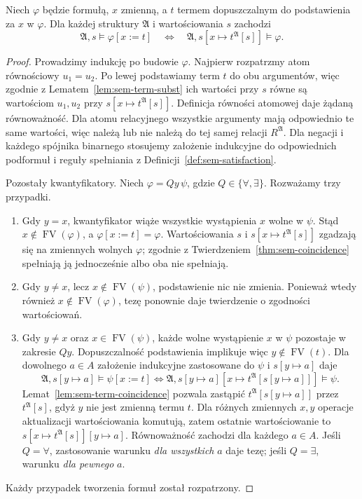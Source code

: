 \begin{twierdzenie}\label{thm:sem-substitution}
Niech $\varphi$ będzie formułą, $x$ zmienną, a $t$ termem
dopuszczalnym do podstawienia za $x$ w $\varphi$.
Dla każdej struktury $\mathfrak A$ i wartościowania $s$ zachodzi
\[
\mathfrak A,s\models\varphi[x:=t]
\quad\Longleftrightarrow\quad
\mathfrak A,s[x\mapsto t^{\mathfrak A}[s]]\models\varphi.
\]
\end{twierdzenie}
\begin{proof}
Prowadzimy indukcję po budowie $\varphi$. Najpierw
rozpatrzmy atom równościowy $u_1=u_2$. Po lewej
podstawiamy term $t$ do obu argumentów, więc zgodnie
z Lematem~\ref{lem:sem-term-subst} ich wartości przy $s$
równe są wartościom $u_1,u_2$ przy
$s[x\mapsto t^{\mathfrak A}[s]]$. Definicja równości
atomowej daje żądaną równoważność. Dla atomu relacyjnego
wszystkie argumenty mają odpowiednio te same wartości,
więc należą lub nie należą do tej samej relacji
$R^{\mathfrak A}$. Dla negacji i każdego spójnika
binarnego stosujemy założenie indukcyjne do odpowiednich
podformuł i reguły spełniania z
Definicji~\ref{def:sem-satisfaction}.

Pozostały kwantyfikatory. Niech $\varphi=Qy\,\psi$,
gdzie $Q\in\{\forall,\exists\}$. Rozważamy trzy przypadki.
\begin{enumerate}[label=(\roman*)]
\item Gdy $y=x$, kwantyfikator wiąże wszystkie wystąpienia
$x$ wolne w $\psi$. Stąd $x\notin\operatorname{FV}(\varphi)$,
a $\varphi[x:=t]=\varphi$. Wartościowania
$s$ i $s[x\mapsto t^{\mathfrak A}[s]]$ zgadzają się
na zmiennych wolnych $\varphi$; zgodnie z
Twierdzeniem~\ref{thm:sem-coincidence} spełniają ją
jednocześnie albo oba nie spełniają.
\item Gdy $y\ne x$, lecz $x\notin\operatorname{FV}(\psi)$,
podstawienie nic nie zmienia. Ponieważ wtedy również
$x\notin\operatorname{FV}(\varphi)$, tezę ponownie
daje twierdzenie o zgodności wartościowań.
\item Gdy $y\ne x$ oraz $x\in\operatorname{FV}(\psi)$,
każde wolne wystąpienie $x$ w $\psi$ pozostaje w zakresie
$Qy$. Dopuszczalność podstawienia implikuje więc
$y\notin\operatorname{FV}(t)$. Dla dowolnego $a\in A$
założenie indukcyjne zastosowane do $\psi$ i
$s[y\mapsto a]$ daje
\[
\mathfrak A,s[y\mapsto a]\models\psi[x:=t]
\iff
\mathfrak A,s[y\mapsto a]
  [x\mapsto t^{\mathfrak A}[s[y\mapsto a]]]
  \models\psi.
\]
Lemat~\ref{lem:sem-term-coincidence} pozwala zastąpić
$t^{\mathfrak A}[s[y\mapsto a]]$ przez
$t^{\mathfrak A}[s]$, gdyż $y$ nie jest zmienną termu $t$.
Dla różnych zmiennych $x,y$ operacje aktualizacji
wartościowania komutują, zatem ostatnie wartościowanie to
$s[x\mapsto t^{\mathfrak A}[s]][y\mapsto a]$.
Równoważność zachodzi dla każdego $a\in A$.
Jeśli $Q=\forall$, zastosowanie warunku \emph{dla wszystkich}
$a$ daje tezę; jeśli $Q=\exists$, warunku
\emph{dla pewnego} $a$.
\end{enumerate}
Każdy przypadek tworzenia formuł został rozpatrzony.
\end{proof}
